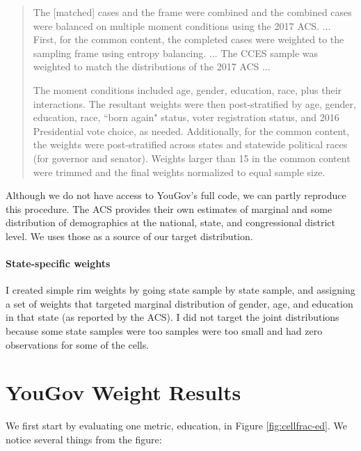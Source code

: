 \documentclass[11pt]{article}
\begin{document}
\begin{quote}
\singlespacing
The [matched] cases and the frame were combined and the combined cases were balanced on multiple moment conditions using the 2017 ACS.  ... First, for the common content, the completed cases were weighted to the sampling frame using entropy balancing. ... The CCES sample was weighted to match the distributions of the 2017 ACS  ... 

The moment conditions included age, gender, education, race, plus their interactions. The resultant weights were then post-stratified by age, gender, education, race, ``born again" status, voter registration status, and 2016 Presidential vote choice, as needed. Additionally, for the common content, the weights were post-stratified across states and statewide political races (for governor and senator). Weights larger than 15 in the common content were trimmed and the final weights normalized to equal sample size. 
\end{quote}

Although we do not have access to YouGov's full code, we can partly reproduce this procedure. The ACS provides their own estimates of marginal and some distribution of demographics at the national, state, and congressional district level. We uses those as a source of our target distribution.

\paragraph{State-specific weights} I created simple rim weights by going state sample by state sample, and assigning a set of weights that targeted marginal distribution of gender, age, and education in that state (as reported by the ACS). I did not target the joint distributions because some state samples were too samples were too small and had zero observations for some of the cells. 

\newpage

\section*{YouGov Weight Results}

We first start by evaluating one metric, education, in Figure \ref{fig:cellfrac-ed}. We notice several things from the figure:

\smallskip
\end{document}
